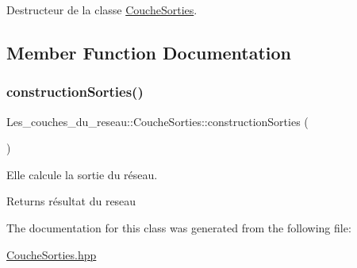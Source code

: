 Destructeur de la classe \hyperlink{class_les__couches__du__reseau_1_1_couche_sorties}{Couche\+Sorties}. 



\subsection{Member Function Documentation}
\mbox{\label{class_les__couches__du__reseau_1_1_couche_sorties_a5d206488b6fed1e3e8ca6b06ae04688d}} 
\subsubsection{\texorpdfstring{construction\+Sorties()}{constructionSorties()}}
{\footnotesize\ttfamily Les\+\_\+couches\+\_\+du\+\_\+reseau\+::\+Couche\+Sorties\+::construction\+Sorties (\begin{DoxyParamCaption}{ }\end{DoxyParamCaption})}



Elle calcule la sortie du réseau. 

\begin{DoxyReturn}{Returns}
résultat du reseau 
\end{DoxyReturn}


The documentation for this class was generated from the following file\+:\begin{DoxyCompactItemize}
\item 
\hyperlink{_couche_sorties_8hpp}{Couche\+Sorties.\+hpp}\end{DoxyCompactItemize}
